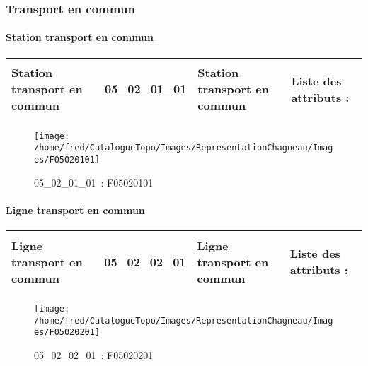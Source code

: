 \documentclass[12pt,titlepage,oneside]{book}
\begin{document}
\subsubsection{\large Transport en commun}
\paragraph{Station transport en commun}
\noindent
\vspace{\baselineskip}

\renewcommand{\arraystretch}{1.2}
\begin{supertabular}{|p{10cm}|c|p{13cm}|p{12cm}|}
 Station transport en commun & 05\_02\_01\_01 & Station transport en commun & Liste des attributs :
\begin{enumerate}
\end{enumerate}
\\
\hline
\end{supertabular}
\begin{figure}[h!]
  \hfill         %
  \begin{minipage}[t]{3cm}
    \begin{center}
      \texttt{[image: /home/fred/CatalogueTopo/Images/RepresentationChagneau/Images/F05020101]}
      \caption[~05\_02\_01\_01]{\small{05\_02\_01\_01~:} \tiny{F05020101}}\label{F05020101}
    \end{center}
  \end{minipage}
\end{figure}


\paragraph{Ligne transport en commun}
\noindent
\vspace{\baselineskip}

\renewcommand{\arraystretch}{1.2}
\begin{supertabular}{|p{10cm}|c|p{13cm}|p{12cm}|}
 Ligne transport en commun & 05\_02\_02\_01 & Ligne transport en commun & Liste des attributs :
\begin{enumerate}
\end{enumerate}
\\
\hline
\end{supertabular}
\begin{figure}[h!]
  \hfill         %
  \begin{minipage}[t]{3cm}
    \begin{center}
      \texttt{[image: /home/fred/CatalogueTopo/Images/RepresentationChagneau/Images/F05020201]}
      \caption[~05\_02\_02\_01]{\small{05\_02\_02\_01~:} \tiny{F05020201}}\label{F05020201}
    \end{center}
  \end{minipage}
\end{figure}
\end{document}
